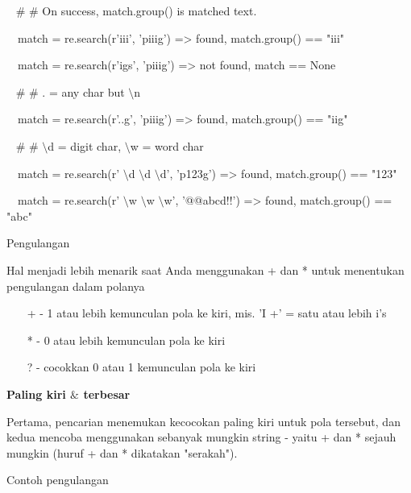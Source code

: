 \begin{12pt}
\begin{12pt}
\begin{12pt}
\begin{12pt}
\begin{12pt}
\begin{12pt}
\begin{12pt}
\noindent 
~  $  \#  $ $  \#  $ On success, match.group() is matched text. \par
\noindent 
~~match = re.search(r'iii', 'piiig') =>  found, match.group() == "iii" \par
\noindent 
~~match = re.search(r'igs', 'piiig') =>  not found, match == None \par
\vspace{12pt}
\noindent 
~  $  \#  $ $  \#  $ . = any char but  $  \setminus  $n \par
\noindent 
~~match = re.search(r'..g', 'piiig') =>  found, match.group() == "iig" \par
\vspace{12pt}
\noindent 
~  $  \#  $ $  \#  $  $  \setminus  $d = digit char,  $  \setminus  $w = word char \par
\noindent 
~~match = re.search(r' $  \setminus  $d $  \setminus  $d $  \setminus  $d', 'p123g') =>  found, match.group() == "123" \par
\noindent 
~~match = re.search(r' $  \setminus  $w $  \setminus  $w $  \setminus  $w', '@@abcd!!') =>  found, match.group() == "abc" \par
\vspace{12pt}
\vspace{12pt}
\noindent 
Pengulangan \par
\vspace{12pt}
\noindent 
Hal menjadi lebih menarik saat Anda menggunakan + dan * untuk menentukan pengulangan dalam polanya \par
\vspace{12pt}
\noindent 
~~~ + - 1 atau lebih kemunculan pola ke kiri, mis. 'I +' = satu atau lebih i's \par
\noindent 
~~~ * - 0 atau lebih kemunculan pola ke kiri \par
\noindent 
~~~ ? - cocokkan 0 atau 1 kemunculan pola ke kiri \par
\vspace{12pt}
\vspace{14pt}
\noindent 
{\fontsize{14pt}{14pt}\selectfont \textbf{Paling kiri  $  \&  $ terbesar} \\} \par
Pertama, pencarian menemukan kecocokan paling kiri untuk pola tersebut, dan kedua mencoba menggunakan sebanyak mungkin string - yaitu + dan * sejauh mungkin (huruf + dan * dikatakan "serakah"). \par
\noindent 
Contoh pengulangan \par
\vspace{12pt}

\end{12pt}
\end{12pt}
\end{12pt}
\end{12pt}
\end{12pt}
\end{12pt}
\end{12pt}
